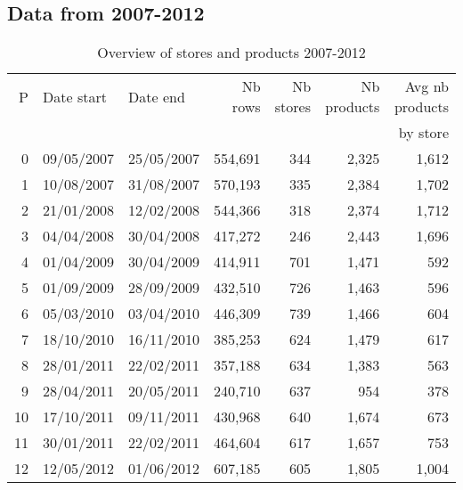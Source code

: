 \documentclass[english]{article}
\begin{document}
\subsection{Data from 2007-2012}

\begin{table}[H]
\renewcommand{\arraystretch}{0.7}%
\caption{Overview of stores and products 2007-2012}
\small

\begin{tabular}{rllrrrr}
\toprule
\toprule
  P &  Date start &    Date end &  Nb rows &  Nb stores &  Nb products &  Avg nb products \\
\multicolumn{6}{c}{}&  by store \\
\midrule
  0 &  09/05/2007 &  25/05/2007 &  554,691 &        344 &        2,325 &                  1,612 \\
  1 &  10/08/2007 &  31/08/2007 &  570,193 &        335 &        2,384 &                  1,702 \\
  2 &  21/01/2008 &  12/02/2008 &  544,366 &        318 &        2,374 &                  1,712 \\
  3 &  04/04/2008 &  30/04/2008 &  417,272 &        246 &        2,443 &                  1,696 \\
  4 &  01/04/2009 &  30/04/2009 &  414,911 &        701 &        1,471 &                    592 \\
  5 &  01/09/2009 &  28/09/2009 &  432,510 &        726 &        1,463 &                    596 \\
  6 &  05/03/2010 &  03/04/2010 &  446,309 &        739 &        1,466 &                    604 \\
  7 &  18/10/2010 &  16/11/2010 &  385,253 &        624 &        1,479 &                    617 \\
  8 &  28/01/2011 &  22/02/2011 &  357,188 &        634 &        1,383 &                    563 \\
  9 &  28/04/2011 &  20/05/2011 &  240,710 &        637 &          954 &                    378 \\
 10 &  17/10/2011 &  09/11/2011 &  430,968 &        640 &        1,674 &                    673 \\
 11 &  30/01/2011 &  22/02/2011 &  464,604 &        617 &        1,657 &                    753 \\
 12 &  12/05/2012 &  01/06/2012 &  607,185 &        605 &        1,805 &                  1,004 \\
\bottomrule
\end{tabular}
\end{table}
\end{document}
